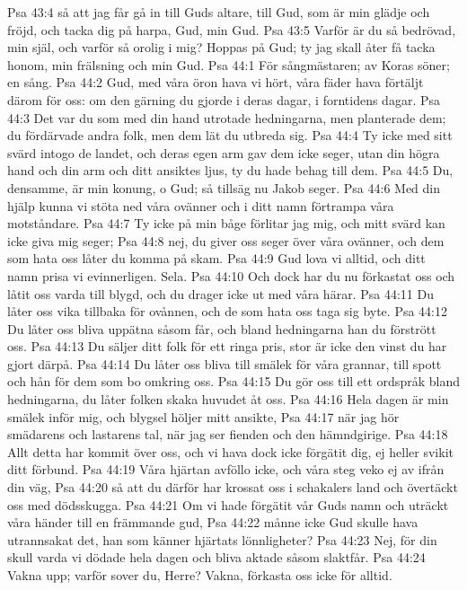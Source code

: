 Psa 43:4  så att jag får gå in till Guds altare, till Gud, som är min glädje och fröjd, och tacka dig på harpa, Gud, min Gud.
Psa 43:5  Varför är du så bedrövad, min själ, och varför så orolig i mig? Hoppas på Gud; ty jag skall åter få tacka honom, min frälsning och min Gud.
Psa 44:1  För sångmästaren; av Koras söner; en sång.
Psa 44:2  Gud, med våra öron hava vi hört, våra fäder hava förtäljt därom för oss: om den gärning du gjorde i deras dagar, i forntidens dagar.
Psa 44:3  Det var du som med din hand utrotade hedningarna, men planterade dem; du fördärvade andra folk, men dem lät du utbreda sig.
Psa 44:4  Ty icke med sitt svärd intogo de landet, och deras egen arm gav dem icke seger, utan din högra hand och din arm och ditt ansiktes ljus, ty du hade behag till dem.
Psa 44:5  Du, densamme, är min konung, o Gud; så tillsäg nu Jakob seger.
Psa 44:6  Med din hjälp kunna vi stöta ned våra ovänner och i ditt namn förtrampa våra motståndare.
Psa 44:7  Ty icke på min båge förlitar jag mig, och mitt svärd kan icke giva mig seger;
Psa 44:8  nej, du giver oss seger över våra ovänner, och dem som hata oss låter du komma på skam.
Psa 44:9  Gud lova vi alltid, och ditt namn prisa vi evinnerligen. Sela.
Psa 44:10  Och dock har du nu förkastat oss och låtit oss varda till blygd, och du drager icke ut med våra härar.
Psa 44:11  Du låter oss vika tillbaka för ovånnen, och de som hata oss taga sig byte.
Psa 44:12  Du låter oss bliva uppätna såsom får, och bland hedningarna han du förstrött oss.
Psa 44:13  Du säljer ditt folk för ett ringa pris, stor är icke den vinst du har gjort därpå.
Psa 44:14  Du låter oss bliva till smälek för våra grannar, till spott och hån för dem som bo omkring oss.
Psa 44:15  Du gör oss till ett ordspråk bland hedningarna, du låter folken skaka huvudet åt oss.
Psa 44:16  Hela dagen är min smälek inför mig, och blygsel höljer mitt ansikte,
Psa 44:17  när jag hör smädarens och lastarens tal, när jag ser fienden och den hämndgirige.
Psa 44:18  Allt detta har kommit över oss, och vi hava dock icke förgätit dig, ej heller svikit ditt förbund.
Psa 44:19  Våra hjärtan avföllo icke, och våra steg veko ej av ifrån din väg,
Psa 44:20  så att du därför har krossat oss i schakalers land och övertäckt oss med dödsskugga.
Psa 44:21  Om vi hade förgätit vår Guds namn och uträckt våra händer till en främmande gud,
Psa 44:22  månne icke Gud skulle hava utrannsakat det, han som känner hjärtats lönnligheter?
Psa 44:23  Nej, för din skull varda vi dödade hela dagen och bliva aktade såsom slaktfår.
Psa 44:24  Vakna upp; varför sover du, Herre? Vakna, förkasta oss icke för alltid.
